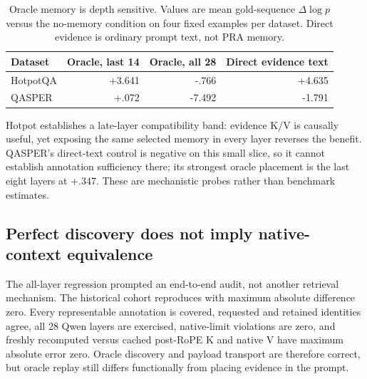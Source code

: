 \documentclass[11pt]{article}
\begin{document}
\begin{table}[H]
\centering
\small
\caption{Oracle memory is depth sensitive.  Values are mean gold-sequence $\Delta\log p$ versus
the no-memory condition on four fixed examples per dataset.  Direct evidence is ordinary prompt
text, not PRA memory.}
\label{tab:depth-headline}
\begin{tabular}{lrrr}
\toprule
Dataset & Oracle, last 14 & Oracle, all 28 & Direct evidence text \\
\midrule
HotpotQA & +3.641 & -.766 & +4.635 \\
QASPER & +.072 & -7.492 & -1.791 \\
\bottomrule
\end{tabular}
\end{table}

Hotpot establishes a late-layer compatibility band: evidence K/V is causally useful, yet exposing
the same selected memory in every layer reverses the benefit.  QASPER's direct-text control is
negative on this small slice, so it cannot establish annotation sufficiency there; its strongest
oracle placement is the last eight layers at +.347.  These are mechanistic probes rather than
benchmark estimates.

\subsection{Perfect discovery does not imply native-context equivalence}
\label{sec:oracle-gap-headline}

The all-layer regression prompted an end-to-end audit, not another retrieval mechanism.  The
historical cohort reproduces with maximum absolute difference zero.  Every representable
annotation is covered, requested and retained identities agree, all 28 Qwen layers are exercised,
native-limit violations are zero, and freshly recomputed versus cached post-RoPE K and native V
have maximum absolute error zero.  Oracle discovery and payload transport are therefore correct,
but oracle replay still differs functionally from placing evidence in the prompt.
\end{document}
